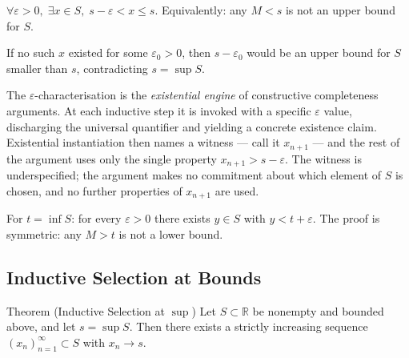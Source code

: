 \begin{remark*}
\end{remark*}


\begin{remark}
$\forall\varepsilon>0,\;\exists x\in S,\;s-\varepsilon<x\leq s$.
Equivalently: any $M<s$ is not an upper bound for $S$.
\end{remark}

\begin{remark}
If no such $x$ existed for some $\varepsilon_0>0$, then $s-\varepsilon_0$
would be an upper bound for $S$ smaller than $s$, contradicting $s=\sup S$.
\end{remark}

\begin{remark}
The $\varepsilon$-characterisation is the \emph{existential engine} of
constructive completeness arguments. At each inductive step it is invoked
with a specific $\varepsilon$ value, discharging the universal quantifier
and yielding a concrete existence claim. Existential instantiation then
names a witness --- call it $x_{n+1}$ --- and the rest of the argument uses
only the single property $x_{n+1}>s-\varepsilon$. The witness is
underspecified; the argument makes no commitment about which element of $S$
is chosen, and no further properties of $x_{n+1}$ are used.
\end{remark}

\begin{remark}
For $t=\inf S$: for every $\varepsilon>0$ there exists $y\in S$ with
$y<t+\varepsilon$. The proof is symmetric: any $M>t$ is not a lower bound.
\end{remark}

\subsection*{Inductive Selection at Bounds}
\label{subsec:inductive-selection}

\begin{theorembox}{Theorem (Inductive Selection at $\sup$)}
\label{thm:inductive-selection}
Let $S\subset\mathbb{R}$ be nonempty and bounded above, and let
$s=\sup S$. Then there exists a strictly increasing sequence
$(x_n)_{n=1}^{\infty}\subset S$ with $x_n\to s$.
\end{theorembox}

